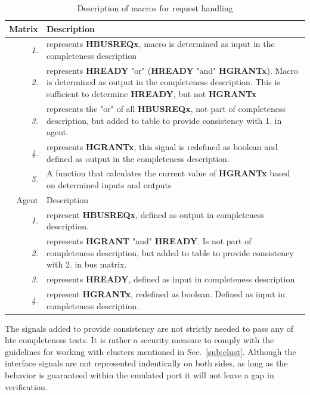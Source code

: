 \begin{table}[hbt] 
  \label{tab:reqmac}
  \begin{tabular}{r p{10cm}} 
  \hline
  Matrix & Description \\
    \hline
  \textit{1.} & represents \textbf{HBUSREQx}, macro is determined as input in the completeness description \\
    \hline
  \textit{2.} & represents \textbf{HREADY} "or" (\textbf{HREADY} "and" \textbf{HGRANTx}). Macro is determined as output in the completeness description. This is sufficient to determine \textbf{HREADY}, but not \textbf{HGRANTx} \\
    \hline
  \textit{3.} & represents the "or" of all \textbf{HBUSREQx}, not part of completeness description, but added to table to provide consistency with 1. in agent. \\ 
    \hline
  \textit{4.} & represents \textbf{HGRANTx}, this signal is redefined as boolean and defined as output in the completeness description. \\
    \hline
  \textit{5.} & A function that calculates the current value of \textbf{HGRANTx} based on determined inputs and outputs \\
    \hline
  Agent & Description \\
    \hline
  \textit{1.} & represent \textbf{HBUSREQx}, defined as output in completeness description. \\
    \hline
  \textit{2.} & represents \textbf{HGRANT} "and" \textbf{HREADY}. Is not part of completeness description, but added to table to provide consistency with 2. in bus matrix. \\
    \hline
  \textit{3.} & represents \textbf{HREADY}, defined as input in completeness description \\
    \hline
  \textit{4.} & represent \textbf{HGRANTx}, redefined as boolean. Defined as input in completeness description. \\
    \hline  \end{tabular}
\caption{Description of macros for request handling}
\end{table}

The signals added to provide consistency are not strictly needed to pass any of hte completeness tests. It is rather a security measure to comply with the guidelines for working with clusters mentioned in 
Sec.~\ref{sub:clust}. Although the interface signals are not represented indentically on both sides, as long as the behavior is guaranteed within the emulated port it will not leave a gap in verification.


